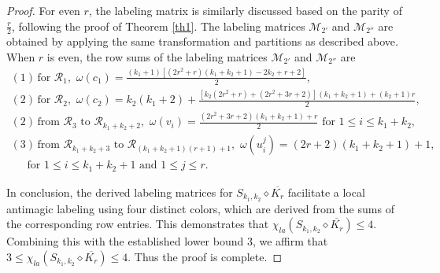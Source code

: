 \documentclass[12pt]{article}
\begin{document}
\begin{proof}
For even $r$, the labeling matrix is similarly discussed based on the parity of $\frac{r}{2}$, following the proof of Theorem \ref{th1}. The labeling matrices $\boldsymbol{\mathcal{M}}_{2'}$ and $\boldsymbol{\mathcal{M}}_{2''}$ are obtained by applying the same transformation and partitions as described above. When $r$ is even, the row sums of the labeling matrices $\boldsymbol{\mathcal{M}}_{2'}$ and $\boldsymbol{\mathcal{M}}_{2''}$ are%
\begin{equation*}
\begin{array}{l}
(1)\,\text{for $\mathcal{R}_{1}$},\,\,\omega(c_{1})=\frac{(k_{1}+1)[(2r^{2}+r)(k_{1}+k_{2}+1)-2k_{2}+r+2]}{2},\\[6pt]
(2)\,\text{for $\mathcal{R}_{2}$},\,\,\omega(c_{2})=k_{2}(k_{1}+2)+\frac{[k_{2}(2r^{2}+r)+(2r^{2}+3r+2)](k_{1}+k_{2}+1)+(k_{2}+1)r}{2},\\[6pt]
(2)\,\text{from $\mathcal{R}_{3}$ to $\mathcal{R}_{k_{1}+k_{2}+2}$},\,\,\omega(v_{i})=\frac{(2r^{2}+3r+2)(k_{1}+k_{2}+1)+r}{2}\text{ for $1\leq i\leq k_{1}+k_{2}$},\hspace{2em}\\[6pt]
(3)\,\text{from $\mathcal{R}_{k_{1}+k_{2}+3}$ to $\mathcal{R}_{(k_{1}+k_{2}+1)(r+1)+1}$},\,\,\omega(u_{i}^{j})=(2r+2)(k_{1}+k_{2}+1)+1,\\[6pt]
\quad\,\text{ for $1\leq i\leq k_{1}+k_{2}+1$ and $1\leq j\leq r$}.
\end{array}
\end{equation*}

In conclusion, the derived labeling matrices for $S_{k_{1},k_{2}}\diamond \overline{K_{r}}$ facilitate a local antimagic labeling using four distinct colors, which are derived from the sums of the corresponding row entries. This demonstrates that $\chi_{la}(S_{k_{1},k_{2}}\diamond \overline{K_{r}})\leq 4$. Combining this with the established lower bound 3, we affirm that $3\leq \chi_{la}(S_{k_{1},k_{2}}\diamond \overline{K_{r}})\leq 4$. Thus the proof is complete.
\end{proof}
\end{document}
